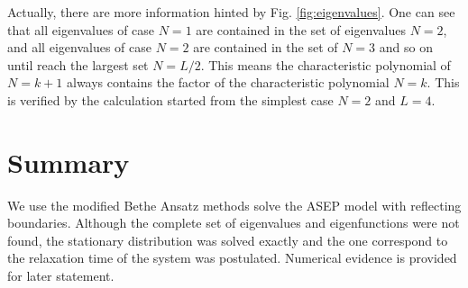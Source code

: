 \documentclass[12pt,a4paper]{article}
\begin{document}
Actually, there are more information hinted by Fig. \ref{fig:eigenvalues}.
One can see that all eigenvalues of case $N=1$ are contained in the set of
eigenvalues $N=2$, and all eigenvalues of case $N=2$ are contained in the set
of $N=3$ and so on until reach the largest set $N=L/2$. This means the
characteristic polynomial of $N=k+1$ always contains the factor of the
characteristic polynomial $N=k$. This is verified by the calculation started
from the simplest case $N=2$ and $L=4$.

\section{Summary}
\label{sec:summeary}
We use the modified Bethe Ansatz methods solve the ASEP model with reflecting
boundaries.  Although the complete set of eigenvalues and eigenfunctions were
not found, the stationary distribution was solved exactly and the one
correspond to the relaxation time of the system was postulated. Numerical
evidence is provided for later statement.


% 
 
\end{document}
